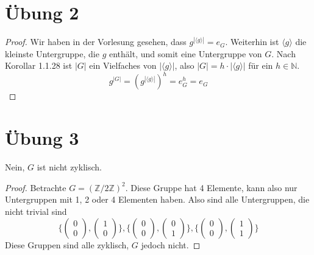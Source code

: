 \documentclass[10pt,a4paper]{article}
\begin{document}
\section{Übung 2}

\begin{proof}
  Wir haben in der Vorlesung gesehen, dass $g^{|\langle g \rangle|} = e_{G}$.
  Weiterhin ist $\langle g \rangle$ die kleinste Untergruppe, die $g$ enthält, und somit eine Untergruppe von $G$.
  Nach Korollar 1.1.28 ist $|G|$ ein Vielfaches von $|\langle g \rangle|$, also $|G| = h \cdot |\langle g \rangle|$ für ein $h \in \mathbb{N}$.
  \begin{equation}
    g^{|G|} = (g^{|\langle g \rangle|})^{h} = e_{G}^{h} = e_{G}
  \end{equation}
\end{proof}

\section{Übung 3}

Nein, $G$ ist nicht zyklisch.

\begin{proof}
  Betrachte $G = (\mathbb{Z} / 2 \mathbb{Z})^{2}$.
  Diese Gruppe hat 4 Elemente, kann also nur Untergruppen mit 1, 2 oder 4 Elementen haben.
  Also sind alle Untergruppen, die nicht trivial sind
  \begin{equation}
    \{ \begin{pmatrix}0\\0\end{pmatrix}, \begin{pmatrix}1\\0\end{pmatrix} \}, \{ \begin{pmatrix}0\\0\end{pmatrix}, \begin{pmatrix}0\\1\end{pmatrix} \}, \{ \begin{pmatrix}0\\0\end{pmatrix}, \begin{pmatrix}1\\1\end{pmatrix} \}
  \end{equation}
  Diese Gruppen sind alle zyklisch, $G$ jedoch nicht.
\end{proof}
\end{document}
